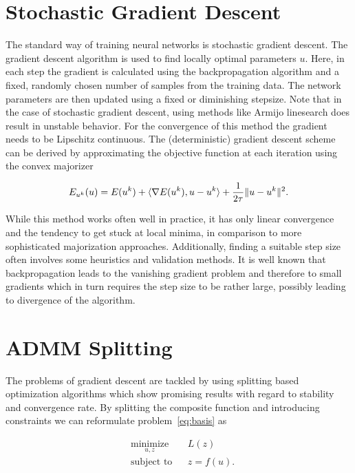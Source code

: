 \documentclass[english,11pt,a4paper]{article}
\begin{document}
\section{Stochastic Gradient Descent}

The standard way of training neural networks is stochastic gradient descent. The gradient descent algorithm is used to find locally optimal parameters $u$. Here, in each step the gradient is calculated using the backpropagation algorithm and a fixed, randomly chosen number of samples from the training data. The network parameters are then updated using a fixed or diminishing stepsize. Note that in the case of stochastic gradient descent, using methods like Armijo linesearch does result in unstable behavior. For the convergence of this method the gradient needs to be Lipschitz continuous. The (deterministic) gradient descent scheme can be derived by approximating the objective function at each iteration using the convex majorizer

\begin{equation}
	E_{u^k}(u) = E(u^k) + \langle \nabla E(u^k), u - u^k \rangle + \frac{1}{2 \tau} \|u - u^k\|^2.
	\label{eq:gd_majorizer}
\end{equation}


While this method works often well in practice, it has only linear convergence and the tendency to get stuck at local minima, in comparison to more sophisticated majorization approaches. Additionally, finding a suitable step size often involves some heuristics and validation methods. It is well known that backpropagation leads to the vanishing gradient problem and therefore to small gradients which in turn requires the step size to be rather large, possibly leading to divergence of the algorithm.

\section{ADMM Splitting}
\label{sec:last-layer_splitting}

The problems of gradient descent are tackled by using splitting based optimization algorithms \cites{carreira2014distributed}{taylor2016training} which show promising results with regard to stability and convergence rate. By splitting the composite function and introducing constraints we can reformulate problem~\ref{eq:basis} as

\begin{equation}
	\begin{aligned}
		& \underset{u,z}{\text{minimize}}
		&& L(z) \\
		& \text{subject to}
		&& z = f(u).
	\end{aligned}
	\label{eq:last-layer_splitting_problem}
\end{equation}
\end{document}
